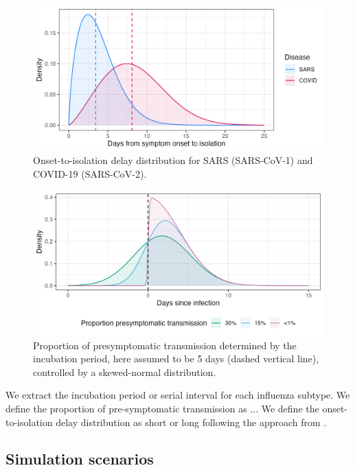 \documentclass{article}
\begin{document}
\begin{figure}[ht]
\centering
\includegraphics[width=\textwidth]{../plots/onset_to_isolation.png}
\caption{Onset-to-isolation delay distribution for SARS (SARS-CoV-1) and
  COVID-19 (SARS-CoV-2).}
\label{fig:onset-to-isolation}
\end{figure}


\begin{figure}[ht]
\centering
\includegraphics[width=\textwidth]{../plots/prop_presymptomatic_transmission.png}
\caption{Proportion of presymptomatic transmission determined by the incubation period, here assumed to be 5 days (dashed vertical line), controlled by a skewed-normal distribution.}
\label{fig:prop-presym-trans}
\end{figure}

We extract the incubation period or serial interval for each influenza subtype. We define the proportion of pre-symptomatic transmission as ... We define the onset-to-isolation delay distribution as short or long following the approach from \cite{hellewellFeasibilityControllingCOVID192020}.

\subsection*{Simulation scenarios}
\end{document}
